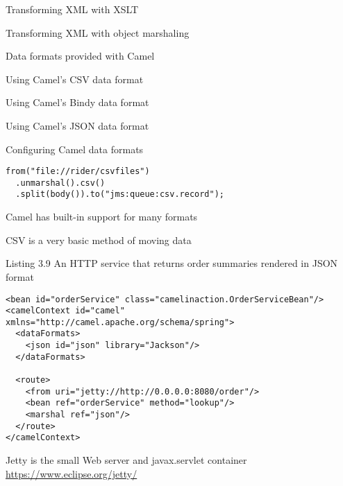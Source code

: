 \documentclass[Screen16to9,17pt]{foils}
\begin{document}



\begin{list2}
\item Transforming XML with XSLT
\item Transforming XML with object marshaling
\end{list2}





\begin{list2}
\item Data formats provided with Camel
\item Using Camel’s CSV data format
\item Using Camel’s Bindy data format
\item Using Camel’s JSON data format
\item Configuring Camel data formats
\end{list2}





\begin{verbatim}
from("file://rider/csvfiles")
  .unmarshal().csv()
  .split(body()).to("jms:queue:csv.record");
\end{verbatim}

\begin{list2}
\item Camel has built-in support for many formats
\item CSV is a very basic method of moving data
\end{list2}



Listing 3.9   An HTTP service that returns order summaries rendered in JSON format
\begin{verbatim}
<bean id="orderService" class="camelinaction.OrderServiceBean"/>
<camelContext id="camel" xmlns="http://camel.apache.org/schema/spring">
  <dataFormats>
    <json id="json" library="Jackson"/>
  </dataFormats>

  <route>
    <from uri="jetty://http://0.0.0.0:8080/order"/>
    <bean ref="orderService" method="lookup"/>
    <marshal ref="json"/>
  </route>
</camelContext>
\end{verbatim}

\begin{list2}
\item Jetty is the small Web server and javax.servlet container \url{https://www.eclipse.org/jetty/}
\end{list2}
\end{document}
